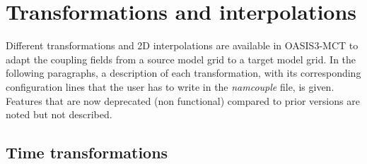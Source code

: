 \newpage
\chapter{Transformations and interpolations}
\label{sec_transformations}

Different transformations and 2D interpolations are available in OASIS3-MCT to adapt the coupling fields from a source model grid to a
target model grid.  In the following paragraphs, a description of each transformation, with its corresponding configuration lines that the
user has to write in the {\it namcouple} file, is given.  Features that are now deprecated (non functional) compared to prior versions are
noted but not described.

\section{Time transformations}
\label{subsec_timetrans}

